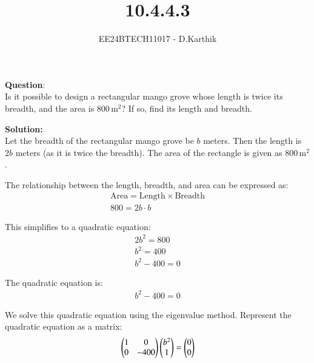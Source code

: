 \documentclass[journal]{IEEEtran}
\begin{document}

\vspace{3cm}

\title{10.4.4.3}
\author{EE24BTECH11017 - D.Karthik}
 \maketitle
{\let\newpage\relax\maketitle}

\renewcommand{\thefigure}{\theenumi}
\renewcommand{\thetable}{\theenumi}
\setlength{\intextsep}{10pt} %


\renewcommand{\thetable}{\theenumi}


\textbf{Question}:\\
Is it possible to design a rectangular mango grove whose length is twice its breadth, and the area is $800\, \text{m}^2$? If so, find its length and breadth.

\textbf{Solution:}\\
Let the breadth of the rectangular mango grove be $b$ meters. Then the length is $2b$ meters (as it is twice the breadth). The area of the rectangle is given as $800\, \text{m}^2$.

The relationship between the length, breadth, and area can be expressed as:
\begin{align}
    \text{Area} = \text{Length} \times \text{Breadth} \\
    800 = 2b \cdot b
\end{align}

This simplifies to a quadratic equation:
\begin{align}
    2b^2 = 800 \\
    b^2 = 400 \\
    b^2 - 400 = 0
\end{align}

The quadratic equation is:
\begin{align}
    b^2 - 400 = 0
\end{align}

We solve this quadratic equation using the eigenvalue method. Represent the quadratic equation as a matrix:
\begin{align}
    \begin{pmatrix}1 & 0 \\
           0 & -400\end{pmatrix} \begin{pmatrix}b^2 \\
           1\end{pmatrix} = \begin{pmatrix}0 \\
           0\end{pmatrix}
\end{align}
\end{document}
